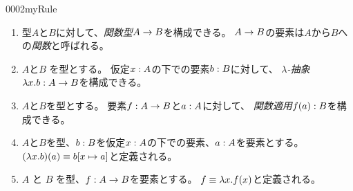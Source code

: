 \documentclass[index]{subfiles}
\begin{document}
\begin{myBlock}{0002}{myRule}
  \begin{enumerate}
  \item 型\(A\)と\(B\)に対して、\emph{関数型}\(A \to B\)を構成できる。
    \(A \to B\)の要素は\(A\)から\(B\)への\emph{関数}と呼ばれる。
  \item \(A\)と\(B\) を型とする。
    仮定\(x : A\)の下での要素\(b : B\)に対して、
    \emph{\(\lambda\)-抽象}\(\lambda x . b : A \to B\)を構成できる。
  \item \(A\)と\(B\)を型とする。
    要素\(f : A \to B\)と\(a : A\)に対して、
    \emph{関数適用}\(f(a) : B\)を構成できる。
  \item \(A\)と\(B\)を型、\(b : B\)を仮定\(x : A\)の下での要素、\(a : A\)を要素とする。
    \((\lambda x . b)(a) \equiv b[x \mapsto a]\)と定義される。
  \item \(A\) と \(B\) を型、\(f : A \to B\)を要素とする。
    \(f \equiv \lambda x . f(x)\)と定義される。
  \end{enumerate}
\end{myBlock}
\end{document}
